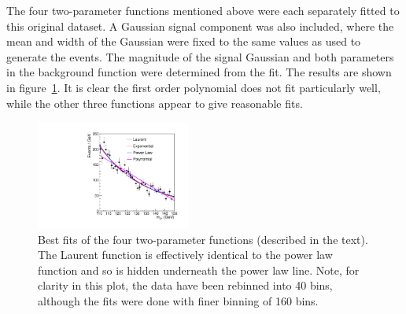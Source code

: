 The four two-parameter functions mentioned above were each 
separately fitted to this
original dataset. A Gaussian signal component was also included, where the
mean and width of the Gaussian were fixed to the same values as used to
generate the events.
The magnitude of the signal Gaussian and both parameters in the
background function were determined from the fit.
The results are shown in figure~\ref{fig:functions:bestfits}.
It is clear the first order polynomial does not fit particularly well, 
while the other three functions appear to give reasonable fits.
%
\begin{figure}[tbp]
\centering
\includegraphics[width=0.45\textwidth]{functions/BestFits.pdf}
\caption{Best fits of the four two-parameter functions (described in the
text).
The Laurent function is effectively identical to the power law function
and so is hidden underneath the power law line.
Note, for clarity in this plot, the
data have been rebinned into 40 bins, although the fits were done with
finer binning of 160 bins.}
\label{fig:functions:bestfits}
\end{figure}

